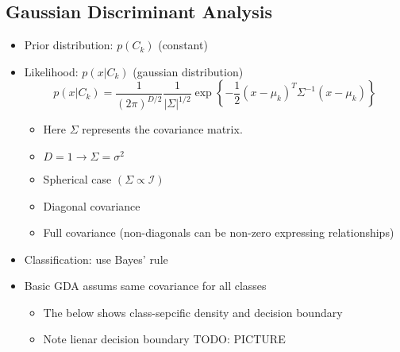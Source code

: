 \subsection{Gaussian Discriminant Analysis}
\begin{itemize}
	\item Prior distribution: $p(C_k)$ (constant)
	\item Likelihood: $p(x|C_k)$ (gaussian distribution)
	$$p(x|C_k)=\frac{1}{(2\pi)^{D/2}}\frac{1}{|\Sigma |^{1/2}}\exp\left\{-\frac{1}{2}(x-\mu_k )^T\Sigma^{-1}(x-\mu_k) \right\}$$
	\begin{itemize}
		\item Here $\Sigma$ represents the covariance matrix.
		\item $D=1\to\Sigma=\sigma^2$
		\item Spherical case $(\Sigma\propto\mathcal{I})$
		\item Diagonal covariance
		\item Full covariance (non-diagonals can be non-zero expressing relationships)
	\end{itemize}
	\item Classification: use Bayes' rule
	\item Basic GDA assums same covariance for all classes
	\begin{itemize}
		\item The below shows class-sepcific density and decision boundary
		\item Note lienar decision boundary
		TODO: PICTURE
	\end{itemize}

\end{itemize}
